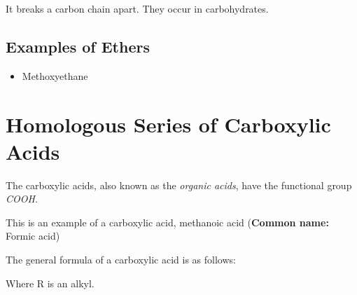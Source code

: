 \documentclass[11pt,twoside]{article}
\begin{document}
		
		It breaks a carbon chain apart. They occur in carbohydrates.
		
		\subsection{Examples of Ethers}
			\begin{itemize}
				\item{ Methoxyethane  }
			\end{itemize}
			
	\section{Homologous Series of Carboxylic Acids}
		The carboxylic acids, also known as the \emph{organic acids}, have the functional group \emph{COOH}.
		
		
		This is an example of a carboxylic acid, methanoic acid (\textbf{Common name:} Formic acid)
		
		The general formula of a carboxylic acid is as follows:
		
		
		Where R is an alkyl.
\end{document}
